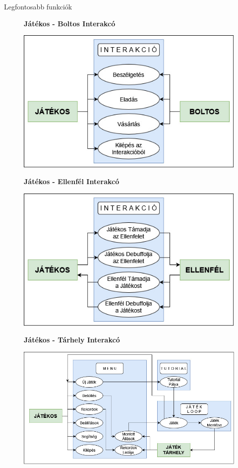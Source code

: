 \documentclass[14pt, aspectratio=169]{beamer}
\begin{document}
	\begin{frame}{Legfontosabb funkciók}
		\only<1>
		{
			\begin{figure}
    			\centering
    			\textbf{Játékos - Boltos Interakcó}\par\medskip
    			\includegraphics[height = 0.6\textheight]{jatekos-boltos.jpg}
			\end{figure}
		}
		{
			\begin{figure}
    			\centering
    			\textbf{Játékos - Ellenfél Interakcó}\par\medskip
    			\includegraphics[height = 0.6\textheight]{jatekos-ellenfel.jpg}
			\end{figure}
		}
		{
			\begin{figure}
    			\centering
    			\textbf{Játékos - Tárhely Interakcó}\par\medskip
    			\includegraphics[height = 0.6\textheight]{jatekos-tarhely.jpg}
			\end{figure}
		}
	\end{frame}
	
\end{document}
